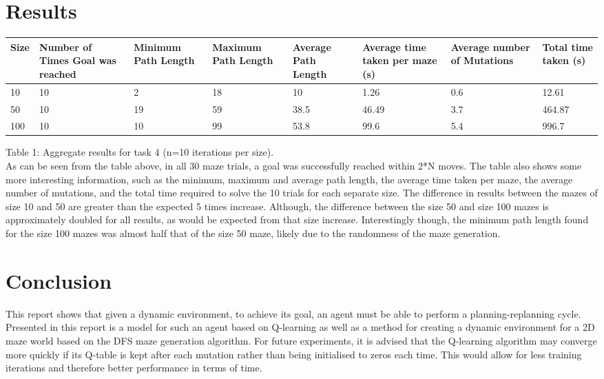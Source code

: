 \documentclass{article}
\begin{document}
    \section{Results}\label{sec:results}

        \begin{tabular}{ | m{1cm} | m{5em}| m{2cm} | m{2cm} | m{2cm} | m{2cm} | m{2cm} | m{2cm} | } 
	\hline
	Size & Number of Times Goal was reached & Minimum Path Length & Maximum Path Length & Average Path Length & Average time taken
	per maze (s) & Average number of Mutations & Total time taken (s)\\
	  \hline
	  10 & 10 & 2 & 18 & 10 & 1.26 & 0.6 & 12.61 \\ 
	  \hline
	  50 & 10 & 19 & 59 & 38.5 & 46.49 & 3.7 & 464.87 \\ 
	  \hline
	  100 & 10 & 10 & 99 & 53.8 & 99.6 & 5.4 & 996.7 \\ 
	  \hline
	\end{tabular}
	Table 1: Aggregate results for task 4 (n=10 iterations per size).
	\vspace*{1cm} \\
	As can be seen from the table above, in all 30 maze trials, a goal was successfully reached within 2*N moves. The table also shows some more interesting information, such as the minimum, maximum and average path length, the average time taken per maze, the average number of mutations, and the total time required to solve the 10 trials for each separate size. The difference in results between the mazes of size 10 and 50 are greater than the expected 5 times increase. Although, the difference between the size 50 and size 100 mazes is approximately doubled for all results, as would be expected from that size increase. Interestingly though, the minimum path length found for the size 100 mazes was almost half that of the size 50 maze, likely due to the randomness of the maze generation.

    
	\section{Conclusion}\label{sec:conclusion}
	This report shows that given a dynamic environment, to achieve its goal, an agent must be able to perform a planning-replanning cycle. Presented in this report is a model for such an agent based on Q-learning as well as a method for creating a dynamic environment for a 2D maze world based on the DFS maze generation algorithm. For future experiments, it is advised that the Q-learning algorithm may converge more quickly if its Q-table is kept after each mutation rather than being initialised to zeros each time. This would allow for less training iterations and therefore better performance in terms of time. 
\end{document}
